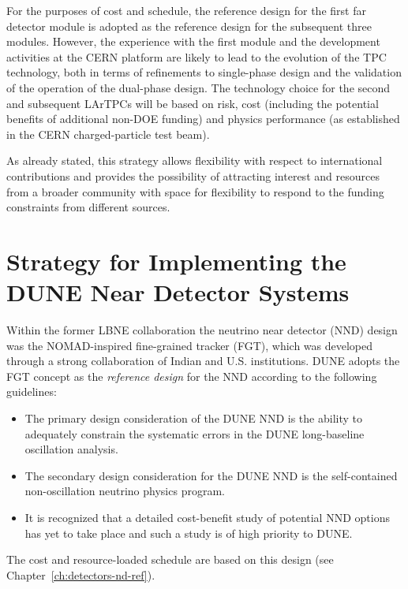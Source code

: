 For the purposes of cost and schedule, the reference design for the
first far detector module is adopted as the reference design for the subsequent
three modules. However, the experience with the first 
module and the development activities at the CERN platform are likely
to lead to the evolution of the TPC technology, both in terms of
refinements to single-phase design and the validation of the operation
of the dual-phase design.  The technology choice for the second and
subsequent LArTPCs will be based on risk, cost (including the
potential benefits of additional non-DOE funding) and physics
performance (as established in the CERN charged-particle test beam).

As already stated, this strategy allows flexibility with respect to international
contributions and provides the possibility of attracting interest and
resources from a broader community with space for flexibility to
respond to the funding constraints from different sources. 

\section{Strategy for Implementing the DUNE Near Detector Systems}



Within the former LBNE collaboration the neutrino near
detector (NND) design was the NOMAD-inspired fine-grained tracker
(FGT), which was developed through a strong collaboration of Indian and
U.S. institutions. DUNE adopts the FGT concept as the 
\textit{reference design} for the NND according to the following guidelines:
\begin{itemize}
\item The primary design consideration of the DUNE NND
is the ability to adequately constrain the systematic
  errors in the DUNE long-baseline oscillation analysis.
\item The secondary design consideration for the DUNE NND is the
  self-contained non-oscillation neutrino physics program.
\item It is recognized that a detailed cost-benefit study of potential
  NND options has yet to take place and such a study is of high
  priority to DUNE. 
\end{itemize}
The cost and resource-loaded schedule are based on this design (see
Chapter~\ref{ch:detectors-nd-ref}).

